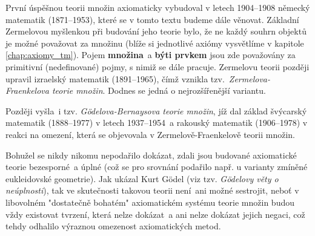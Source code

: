 První úspěšnou teorii množin axiomaticky vybudoval v letech 1904--1908 německý matematik  (1871--1953), které se v tomto textu budeme dále věnovat. Základní Zermelovou myšlenkou při budování jeho teorie bylo, že ne každý souhrn objektů je možné považovat za množinu (blíže si jednotlivé axiómy vysvětlíme v kapitole \ref{chap:axiomy_tm}). Pojem \textbf{množina}~a \textbf{býti prvkem} jsou zde považovány za primitivní (nedefinované) pojmy, s nimiž se dále pracuje. Zermelovu teorii později upravil izraelský matematik  (1891--1965), čímž vznikla tzv.~\emph{Zermelova-Fraenkelova teorie množin}. Dodnes se jedná o nejrozšířenější variantu.\par
Později vyšla~i tzv. \emph{Gödelova-Bernaysova teorie množin}, jíž dal základ švýcarský matematik  (1888--1977) v letech 1937--1954~a rakouský matematik  (1906--1978) v reakci na omezení, která se objevovala v Zermelově-Fraenkelově teorii množin.

Bohužel se nikdy nikomu nepodařilo dokázat, zdali jsou budované axiomatické teorie bezesporné~a úplné (což se pro srovnání podařilo např. u varianty zmíněné eukleidovské geometrie). Jak ukázal Kurt Gödel (viz tzv. \emph{Gödelovy věty o neúplnosti}), tak ve skutečnosti takovou teorii není~ani možné sestrojit, neboť v libovolném "dostatečně bohatém" axiomatickém systému teorie množin budou vždy existovat tvrzení, která nelze dokázat~a ani nelze dokázat jejich negaci, což tehdy odhalilo výraznou omezenost axiomatických metod. 